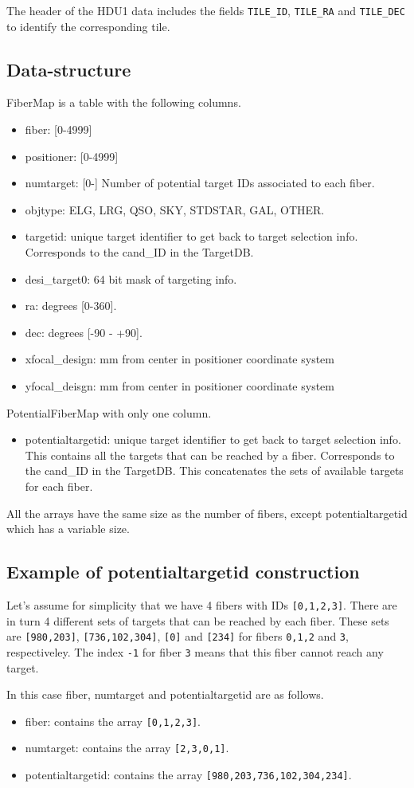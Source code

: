 \documentclass{article}
\begin{document}
The header of the HDU1 data includes the fields \texttt{TILE\_ID},
\texttt{TILE\_RA} and \texttt{TILE\_DEC} to identify the corresponding
tile.  

\subsection{Data-structure}

FiberMap is a table with the following columns.
\begin{itemize}
\item fiber: [0-4999]
\item positioner: [0-4999]
\item numtarget: [0-] Number of potential target IDs associated to each
  fiber. 
\item objtype: ELG, LRG, QSO, SKY, STDSTAR, GAL, OTHER. 
\item targetid: 
  unique target identifier to get back to target
  selection info. Corresponds to the cand\_ID in the TargetDB.
\item desi\_target0: 64 bit mask of targeting info. 
\item ra: degrees [0-360]. 
\item dec: degrees [-90 - +90]. 
\item xfocal\_design: mm from center in positioner coordinate system 
\item yfocal\_deisgn: mm from center in positioner coordinate system  
\end{itemize}

\noindent
PotentialFiberMap with only one column.
\begin{itemize}
\item potentialtargetid:  unique target identifier to get back to target
  selection info. This contains  all the targets that can be
  reached by a fiber. Corresponds to the cand\_ID in the TargetDB. 
  This concatenates the sets of available
  targets for each fiber.
\end{itemize}
All the arrays have the same size as the number of fibers, except
potentialtargetid which has a variable size.



\subsection{Example of potentialtargetid construction}
Let's assume for simplicity that we have 4 fibers with IDs
\texttt{[0,1,2,3]}. There are in turn 4 different sets of targets that
can be reached by each fiber. These sets are \texttt{[980,203]},
\texttt{[736,102,304]}, \texttt{[0]} and \texttt{[234]} for fibers
\texttt{0,1,2} and \texttt{3}, respectiveley.
The index \texttt{-1} for fiber \texttt{3} means that this fiber
cannot reach any target.

In this case fiber, numtarget and potentialtargetid are as follows.
\begin{itemize}
\item
fiber: contains the array \texttt{[0,1,2,3]}.
\item
numtarget: contains the array \texttt{[2,3,0,1]}.
\item
potentialtargetid: contains the array \texttt{[980,203,736,102,304,234]}.

\end{itemize}
\end{document}
